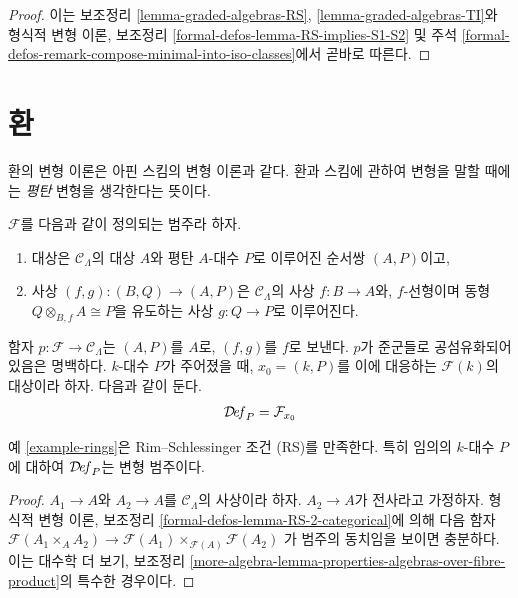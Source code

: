 \begin{proof}
이는 보조정리 \ref{lemma-graded-algebras-RS},
\ref{lemma-graded-algebras-TI}와 형식적 변형 이론, 보조정리
\ref{formal-defos-lemma-RS-implies-S1-S2} 및 주석
\ref{formal-defos-remark-compose-minimal-into-iso-classes}에서 곧바로 따른다.
\end{proof}







\section{환}
\label{section-rings}

\noindent
환의 변형 이론은 아핀 스킴의 변형 이론과 같다. 환과 스킴에 관하여
변형을 말할 때에는 {\it 평탄} 변형을 생각한다는 뜻이다.

\begin{example}[환]
\label{example-rings}
$\mathcal{F}$를 다음과 같이 정의되는 범주라 하자.
\begin{enumerate}
\item 대상은 $\mathcal{C}_\Lambda$의 대상 $A$와 평탄 $A$-대수 $P$로
이루어진 순서쌍 $(A, P)$이고,
\item 사상 $(f, g) : (B, Q) \to (A, P)$은
$\mathcal{C}_\Lambda$의 사상 $f : B \to A$와, $f$-선형이며
동형 $Q \otimes_{B, f} A \cong P$을 유도하는 사상
$g : Q \to P$로 이루어진다.%
\end{enumerate}
함자 $p : \mathcal{F} \to \mathcal{C}_\Lambda$는 $(A, P)$를 $A$로,
$(f, g)$를 $f$로 보낸다. $p$가 준군들로 공섬유화되어 있음은 명백하다.
$k$-대수 $P$가 주어졌을 때, $x_0 = (k, P)$를 이에 대응하는
$\mathcal{F}(k)$의 대상이라 하자. 다음과 같이 둔다.
$$
\mathcal{D}\!\mathit{ef}_P = \mathcal{F}_{x_0}
$$
\end{example}

\begin{lemma}
\label{lemma-rings-RS}
예 \ref{example-rings}은 Rim--Schlessinger 조건 (RS)를 만족한다.
특히 임의의 $k$-대수 $P$에 대하여 $\mathcal{D}\!\mathit{ef}_P$는
변형 범주이다.
\end{lemma}

\begin{proof}
$A_1 \to A$와 $A_2 \to A$를 $\mathcal{C}_\Lambda$의 사상이라 하자.
$A_2 \to A$가 전사라고 가정하자. 형식적 변형 이론, 보조정리
\ref{formal-defos-lemma-RS-2-categorical}에 의해 다음 함자
$\mathcal{F}(A_1 \times_A A_2) \to
\mathcal{F}(A_1) \times_{\mathcal{F}(A)} \mathcal{F}(A_2)$
가 범주의 동치임을 보이면 충분하다. 이는 대수학 더 보기, 보조정리
\ref{more-algebra-lemma-properties-algebras-over-fibre-product}의
특수한 경우이다.
\end{proof}

